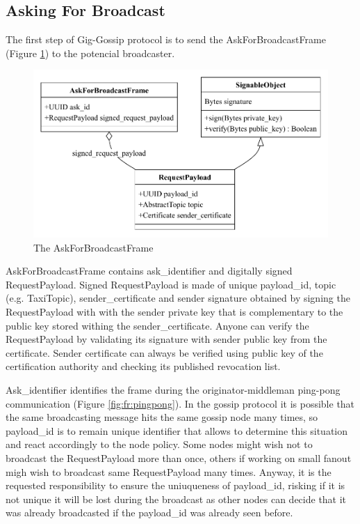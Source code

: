 \documentclass{article}
\begin{document}
\subsection{Asking For Broadcast}
The first step of Gig-Gossip protocol is to send the AskForBroadcastFrame (Figure \ref{fig:fr:askforbroadcast}) to the potencial broadcaster.

\begin{figure}
	\centering
	\includegraphics[scale=0.7]{AskForBroadcast.pdf}
	\caption{The AskForBroadcastFrame}
	\label{fig:fr:askforbroadcast}
\end{figure}

AskForBroadcastFrame contains ask\_identifier and digitally signed RequestPayload. Signed RequestPayload is made of unique payload\_id, topic (e.g. TaxiTopic), sender\_certificate and sender signature obtained by signing the RequestPayload with with the sender private key that is complementary to the public key stored withing the sender\_certificate. Anyone can verify the RequestPayload by validating its signature with sender public key from the certificate. Sender certificate can always be verified using public key of the certification authority and checking its published revocation list.

Ask\_identifier identifies the frame during the originator-middleman ping-pong communication (Figure \ref{fig:fr:pingpong}). In the gossip protocol it is possible that the same broadcasting message hits the same gossip node many times, so payload\_id is to remain unique identifier that allows to determine this situation and react accordingly to the node policy. Some nodes might wish not to broadcast the RequestPayload more than once, others if working on small fanout migh wish to broadcast same RequestPayload many times. Anyway, it is the requested responsibility to ensure the uniuqueness of payload\_id, risking if it is not unique it will be lost during the broadcast as other nodes can decide that it was already broadcasted if the payload\_id was already seen before.
\end{document}
